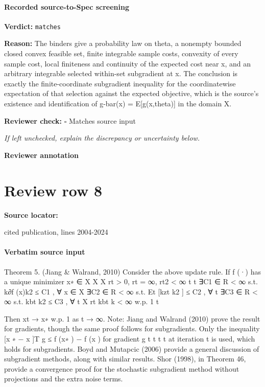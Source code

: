 \documentclass[10pt]{article}
\newcommand{\reviewerbox}{%
  \par\noindent\fbox{\parbox{0.96\linewidth}{\rule{0pt}{0.38in}}}\par
}
\newcommand{\reviewmatch}[1]{%
  \par\noindent\textbf{Reviewer check:} $\square$\; #1\par
  \noindent\emph{If left unchecked, explain the discrepancy or uncertainty below.}\par
}
\begin{document}
\paragraph{Recorded source-to-Spec screening}
\textbf{Verdict:} \texttt{matches}
\\
{\raggedright
\textbf{Reason:} The binders give a probability law on theta, a nonempty bounded closed convex feasible set, finite integrable sample costs, convexity of every sample cost, local finiteness and continuity of the expected cost near x, and an arbitrary integrable selected within-\allowbreak{}set subgradient at x.\allowbreak{} The conclusion is exactly the finite-\allowbreak{}coordinate subgradient inequality for the coordinatewise expectation of that selection against the expected objective, which is the source's existence and identification of g-\allowbreak{}bar(x) = E[g(x,theta)] in the domain X.\allowbreak{}
\par}
\reviewmatch{Matches source input}
\noindent\textbf{Reviewer annotation}\par
\reviewerbox
\clearpage
\hypertarget{source-claim-f8e78133bd080649}{}
\section*{Review row 8}
\textbf{Source locator:} {\footnotesize\raggedright cited publication, lines 2004-\allowbreak{}2024\par}
\paragraph{Verbatim source input}
\begin{ReviewVerbatim}
Theorem 5. (Jiang & Walrand, 2010) Consider the above update rule. If
                                 f (·) has a unique minimizer x∗ ∈ X
                                         X           X
                                 rt > 0,     rt = ∞,    rt2 < ∞
                                          t            t
                                 ∃C1 ∈ R < ∞ s.t. k∂f (x)k2 ≤ C1 , ∀ x ∈ X
                                 ∃C2 ∈ R < ∞ s.t. Et [kzt k2 ] ≤ C2 , ∀ t
                                 ∃C3 ∈ R < ∞ s.t. kbt k2 ≤ C3 , ∀ t
                                 X
                                    rt kbt k < ∞ w.p. 1
                                  t

Then xt    → x∗   w.p. 1 as t → ∞.
   Note: Jiang and Walrand (2010) prove the result for gradients, though the same proof
follows for subgradients. Only the inequality [x
                                                             ∗ − x ]T g ≤ f (x∗ ) − f (x ) for gradient g
                                                                  t    t                t                t
at iteration t is used, which holds for subgradients.              Boyd and Mutapcic (2006) provide
a general discussion of subgradient methods, along with similar results.                  Shor (1998), in
Theorem 46, provide a convergence proof for the stochastic subgradient method without
projections and the extra noise terms.
\end{ReviewVerbatim}
\end{document}
